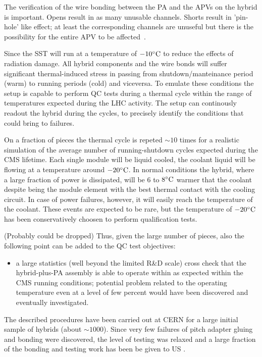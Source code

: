 The verification of the wire bonding between the PA and the APVs on
the hybrid is important. Opens result in as many unusable 
channels. Shorts result in 'pin-hole' like effect; at
least the corresponding channels are unuseful but there is the
possibility for the entire APV to be affected~\cite{hip}. 

Since the SST will run at a temperature of $-10^{\circ}{\rm C}$ to reduce the
effects of radiation damage. All hybrid components and the wire bonds
will suffer significant thermal-induced stress in passing from
shutdown/manteinance period (warm) to running periods (cold) and viceversa.
To emulate these conditions the setup is capable to perform QC tests
during a thermal cycle within the range of temperatures expected
during the LHC activity. The setup
can continously readout the hybrid during the cycles, to precisely
identify the conditions that could bring to failures.

On a fraction of pieces the thermal cycle is repeted $\sim10$ times
for a realistic simulation of the average number of running-shutdown cycles
expected during the CMS lifetime. Each single module will be liquid cooled,
the coolant liquid will be flowing at a temperature around
$-20^{\circ}{\rm C}$. In normal conditions the hybrid, where a large fraction 
of power is dissipated, will be $6$ to $8^{\circ}{\rm C}$ warmer that the
coolant despite being the module element with the best thermal contact
with the cooling circuit. In case of power failures, however, it will
easily reach the temperature of the coolant. These events are
expected to be rare, but the temperature of $-20^{\circ}{\rm C}$ has been
conservatively choosen to perform qualification tests.

(\fixme Probably could be dropped) Thus, given the large number
of pieces, also the following point can be added to the QC test
objectives:
\begin{itemize}
\item a large statistics (well beyond the limited R\&D scale) cross
  check that the hybrid-plus-PA assembly is able to operate within as
  expected within the CMS running conditions; potential problem related 
  to the operating temperature even at a level of few percent would
  have been discovered and eventually investigated.
\end{itemize}

The described procedures have been carried out at CERN for a large
initial sample of hybrids (about $\sim1000$). Since very few 
failures of pitch adapter gluing and bonding were discovered, the
level of testing was relaxed and a large fraction of the bonding and
testing work has been be given to US \fixme.


